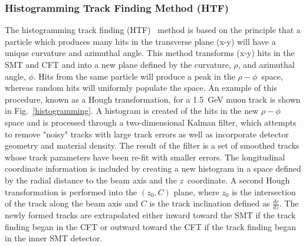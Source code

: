 \subsubsection{Histogramming Track Finding Method (HTF)}
\label{htf}

The histogramming track finding (HTF)~\cite{htf} method is based on the principle that a particle which produces many hits in the transverse plane (x-y) will have a unique curvature and azimuthal angle. This method transforms (x-y) hits in the SMT and CFT and into a new plane defined by the curvature, $\rho$, and azimuthal angle, $\phi$. Hits from the same particle will produce a peak in the $\rho-\phi$~space, whereas random hits will uniformly populate the space. An example of this procedure, known as a Hough transformation, for a 1.5~GeV muon track is shown in Fig.~\ref{histogramming}. A histogram is created of the hits in the new $\rho-\phi$ space and is processed through a two-dimensional Kalman filter, which attempts to remove "noisy" tracks with large track errors as well as incorporate detector geometry and material density. The result of the filter is a set of smoothed tracks whose track parameters have been re-fit with smaller errors. The longitudinal coordinate information is included by creating a new histogram in a space defined by the radial distance to the beam axis and the $z$~coordinate. A second Hough transformation is performed into the $(z_{0},C)$ plane, where $z_{0}$ is the intersection of the track along the beam axis and $C$ is the track inclination defined as $\frac{dr}{dz}$. The newly formed tracks are extrapolated either inward toward the SMT if the track finding began in the CFT or outward toward the CFT if the track finding began in the inner SMT detector.

